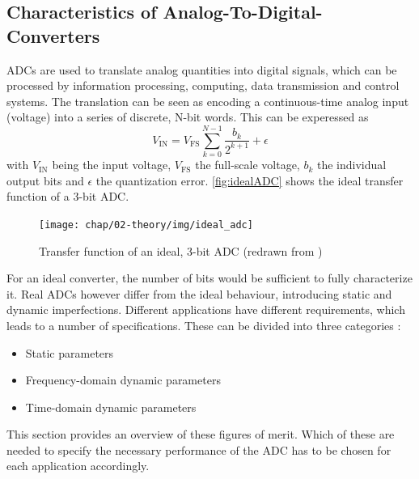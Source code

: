 \subsection{Characteristics of Analog-To-Digital-Converters}
ADCs are used to translate analog quantities into digital signals, which can be processed by information processing, computing, data transmission and control systems. The translation can be seen as encoding a continuous-time analog input (voltage) into a series of discrete, N-bit words. This can be experessed as
\begin{equation}
	V_{\text{IN}} = V_{\text{FS}} \sum_{k = 0}^{N-1} \frac{b_k}{2^{k+1}} + \epsilon
\end{equation}
with $V_{\text{IN}}$ being the input voltage, $V_{\text{FS}}$ the full-scale voltage, $b_k$ the individual output bits and $\epsilon$ the quantization error. \autoref{fig:idealADC} shows the ideal transfer function of a 3-bit ADC.
\begin{figure}[H]
	\centering
	\texttt{[image: chap/02-theory/img/ideal\_adc]}
	\caption{Transfer function of an ideal, 3-bit ADC (redrawn from \cite{Lundberg})}
	\label{fig:idealADC}
\end{figure}



For an ideal converter, the number of bits would be sufficient to fully characterize it. Real ADCs however differ from the ideal behaviour, introducing static and dynamic imperfections. Different applications have different requirements, which leads to a number of specifications. These can be divided into three categories \cite{Lundberg}:
\begin{itemize}[noitemsep]
	\item Static parameters
	\item Frequency-domain dynamic parameters
	\item Time-domain dynamic parameters
\end{itemize}
This section provides an overview of these figures of merit. Which of these are needed to specify the necessary performance of the ADC has to be chosen for each application accordingly.


